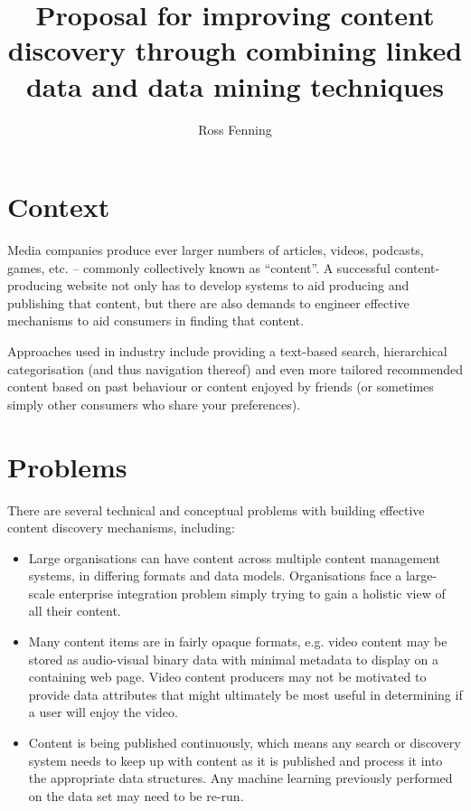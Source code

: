 \documentclass[10pt,a4paper]{article}
\title{Proposal for improving content discovery through combining linked data
and data mining techniques}
\author{Ross Fenning}
\date{}
\begin{document}
\maketitle \thispagestyle{empty}

\section{Context}

Media companies produce ever larger numbers of articles, videos, podcasts,
games, etc. -- commonly collectively known as ``content''. A successful
content-producing website not only has to develop systems to aid producing and
publishing that content, but there are also demands to engineer effective
mechanisms to aid consumers in finding that content.

Approaches used in industry include providing a text-based search, hierarchical
categorisation (and thus navigation thereof) and even more tailored recommended
content based on past behaviour or content enjoyed by friends (or sometimes
simply other consumers who share your preferences).

\section{Problems}

There are several technical and conceptual problems with building effective
content discovery mechanisms, including:

\begin{itemize}

\item Large organisations can have content across multiple content management
systems, in differing formats and data models. Organisations face a large-scale
enterprise integration problem simply trying to gain a holistic view of all
their content.

\item Many content items are in fairly opaque formats, e.g. video content may be
stored as audio-visual binary data with minimal metadata to display on a
containing web page. Video content producers may not be motivated to provide
data attributes that might ultimately be most useful in determining if a user
will enjoy the video.

\item Content is being published continuously, which means any search or
discovery system needs to keep up with content as it is published and process it
into the appropriate data structures. Any machine learning previously performed
on the data set may need to be re-run.

\end{itemize}
\end{document}
